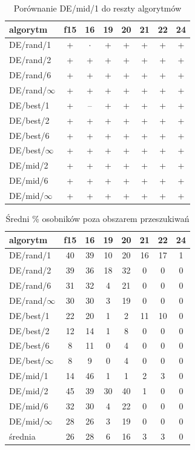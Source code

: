 \documentclass[a4paper,onecolumn,oneside,11pt,wide,floatssmall]{mwrep}
\theoremstyle{definition}
\theoremstyle{plain}%
\theoremstyle{remark}
\begin{document}
\begin{table}[H]
\centering
\begin{tabular}{ l | c | c | c | c | c | c | c }
algorytm         &f15& 16& 19& 20& 21& 22& 24 \\ \hline
DE/rand/1	 & + & $\cdot$ & + & + & + & + & + \\
DE/rand/2	 & + & + & + & + & + & + & + \\
DE/rand/6	 & + & + & + & + & + & + & + \\
DE/rand/$\infty$	 & + & + & + & + & + & + & + \\
DE/best/1	 & + & -- & + & + & + & + & + \\
DE/best/2	 & + & + & + & + & + & + & + \\
DE/best/6	 & + & + & + & + & + & + & + \\
DE/best/$\infty$	 & + & + & + & + & + & + & + \\
DE/mid/2	 & + & + & + & + & + & + & + \\
DE/mid/6	 & + & + & + & + & + & + & + \\
DE/mid/$\infty$	 & + & + & + & + & + & + & + \\
\end{tabular}
\caption{Porównanie DE/mid/1 do reszty algorytmów}
\end{table}

\begin{table}[H]
\centering
\begin{tabular}{ l | c | c | c | c | c | c | c }
algorytm         &f15& 16& 19& 20& 21& 22& 24 \\ \hline
DE/rand/1	 & 40 & 39 & 10 & 20 & 16 & 17 & 1    \\
DE/rand/2	 & 39 & 36 & 18 & 32 & 0 & 0 & 0  \\
DE/rand/6	 & 31 & 32 & 4 & 21 & 0 & 0 & 0        \\
DE/rand/$\infty$ & 30 & 30 & 3 & 19 & 0 & 0 & 0     \\
DE/best/1	 & 22 & 20 & 1 & 2 & 11 & 10 & 0   \\
DE/best/2	 & 12 & 14 & 1 & 8 & 0 & 0 & 0     \\
DE/best/6	 & 8 & 11 & 0 & 4 & 0 & 0 & 0        \\
DE/best/$\infty$ & 8 & 9 & 0 & 4 & 0 & 0 & 0      \\
DE/mid/1         & 14 & 46 & 1 & 1 & 2 & 3 & 0   \\
DE/mid/2	 & 45 & 39 & 30 & 40 & 1 & 0 & 0      \\
DE/mid/6	 & 32 & 30 & 4 & 22 & 0 & 0 & 0     \\
DE/mid/$\infty$	 & 28 & 26 & 3 & 19 & 0 & 0 & 0     \\ \hline
średnia          & 26 & 28 & 6 & 16 & 3 & 3 & 0 \\  
\end{tabular}
\caption{Średni \% osobników poza obszarem przeszukiwań}
\end{table}
\end{document}
